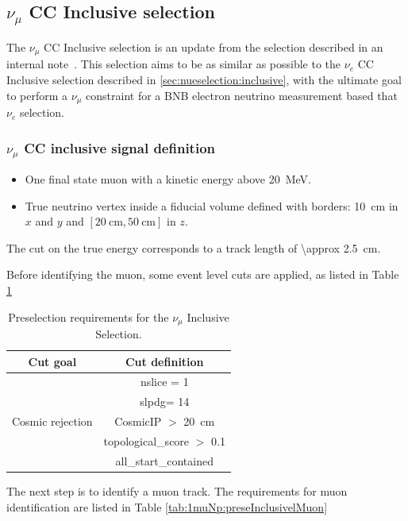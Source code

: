 \newcommand{\pct}[1]{\SI{#1}{\%}}
\subsection{$\nu_\mu$ CC Inclusive selection}
\label{ssec:NuMUCCsel:INC}
The $\nu_\mu$ CC Inclusive selection is an update from the selection described in an internal note~\cite{bib:numuccfilter}. This selection aims to be as similar as possible to the $\nu_e$ CC Inclusive selection described in \cref{sec:nueselection:inclusive}, with the ultimate goal to perform a $\nu_\mu$ constraint for a BNB electron neutrino measurement  based that $\nu_e$ selection. 

\subsubsection{$\nu_\mu$ CC inclusive signal definition}
\begin{itemize}
    \item One final state muon with a kinetic energy above \SI{20}{\MeV}.
    \item True neutrino vertex inside a fiducial volume defined with borders: \SI{10}{\cm} in $x$ and $y$ and $[ \SI{20}{\cm}, \SI{50}{\cm}]$ in $z$.
\end{itemize}
The cut on the true energy corresponds to a track length of \SI{\approx 2.5}{\cm}.

Before identifying the muon, some event level cuts are applied, as listed in Table \ref{tab:1muNp:preseInclusivel}

\begin{table}[h!]
\centering
\setlength{\tabcolsep}{10pt}
\renewcommand{\arraystretch}{1.25}
 \begin{tabular}{| c | c |} 
 \hline
 Cut goal & Cut definition \\
 \hline\hline
\multirow{5}{*}{ Cosmic rejection } & nslice = 1 \\ & slpdg= 14\\ &CosmicIP $>$ \SI{20}{\cm}\\
& topological\_score $>$ 0.1 \\ &all\_start\_contained\\
 \hline
 \end{tabular}
 \caption{\label{tab:1muNp:preseInclusivel} Preselection requirements for the $\nu_\mu$ Inclusive Selection.}
\end{table}

The next step is to identify a muon track. The requirements for muon identification are listed in Table \ref{tab:1muNp:preseInclusivelMuon}

